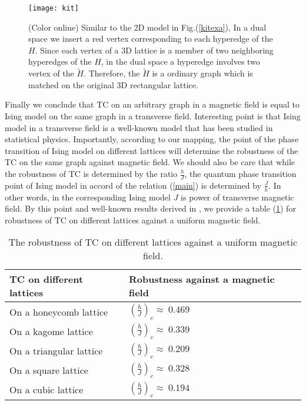 \documentclass[preprintnumbers, showpacs, floatfix,twocolumn,
preprintnumbers, superscriptaddress]{revtex4}
\begin{document}
\begin{figure}[t]
\centering
\texttt{[image: kit]}
\caption{(Color online) Similar to the 2D model in Fig.(\ref{kitexa}), In a dual space we insert a red vertex corresponding to each hyperedge of the $H$. Since each vertex of a 3D lattice is a member of two neighboring hyperedges of the $H$, in the dual space a hyperedge involves two vertex of the $\tilde{H}$. Therefore, the $\tilde{H}$ is a ordinary graph which is matched on the original 3D rectangular lattice.} \label{kit}
\end{figure}
Finally we conclude that TC on an arbitrary graph in a magnetic
field is equal to Ising model on the same graph in a transverse
field. Interesting point is that Ising model in a transverse field
is a well-known model that has been studied in statistical
physics. Importantly, according to our mapping, the point of the
phase transition of Ising model on different lattices will
determine the robustness of the TC on the same graph against
magnetic field. We should also be care that while the robustness
of TC is determined by the ratio $\frac{h}{J}$, the quantum phase
transition point of Ising model in accord of the relation
(\ref{main}) is determined by $\frac{J}{h}$. In other words, in
the corresponding Ising model $J$ is power of transverse magnetic
field. By this point and well-known results derived in
\cite{trans}, we provide a table (\ref{tab}) for robustness of TC
on different lattices against a uniform magnetic field.
\begin{table}[t]
\centering
\begin{tabular}{ |p{4cm}|p{5cm}| }
\hline
 TC on different lattices & Robustness against a magnetic field\\
\hline

 On a honeycomb lattice & $(\frac{h}{J})_c \approx ~ 0.469$\\

\hline
On a kagome lattice &$(\frac{h}{J})_c \approx ~ 0.339$\\

\hline
 On a triangular lattice &  $(\frac{h}{J})_c \approx ~ 0.209$\\

\hline
On a square lattice & $(\frac{h}{J})_c \approx ~ 0.328$\\

\hline
 On a cubic lattice & $(\frac{h}{J})_c \approx ~ 0.194$\\

\hline
\end{tabular}
\caption{The robustness of TC on different lattices against a
uniform magnetic field.} \label{tab}
\end{table}
\end{document}
